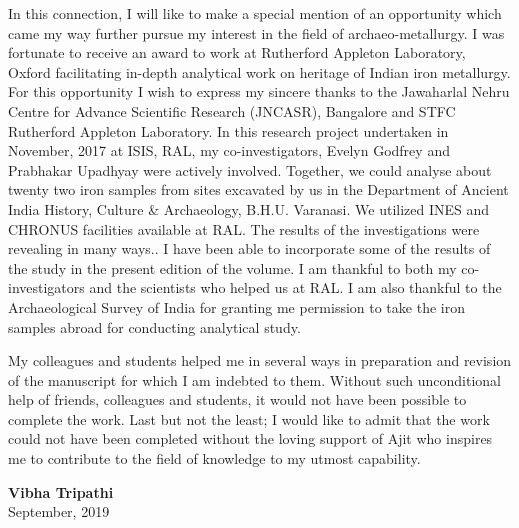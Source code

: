 In this connection, I will like to make a special mention of an opportunity which came my way further pursue my interest in the field of archaeo-metallurgy. I was fortunate to receive an award to work at Rutherford Appleton Laboratory, Oxford facilitating in-depth analytical work on heritage of Indian iron metallurgy. For this opportunity I wish to express my sincere thanks to the Jawaharlal Nehru Centre for Advance Scientific Research (JNCASR), Bangalore and STFC Rutherford Appleton Laboratory. In this research project undertaken in November, 2017 at ISIS, RAL, my co-investigators, Evelyn Godfrey and Prabhakar Upadhyay were actively involved. Together, we could analyse about twenty two iron samples from sites excavated by us in the Department of Ancient India History, Culture \& Archaeology, B.H.U. Varanasi. We utilized INES and CHRONUS facilities available at RAL. The results of the investigations were revealing in many ways.. I have been able to incorporate some of the results of the study in the present edition of the volume. I am thankful to both my co-investigators and the scientists who helped us at RAL. I am also thankful to the Archaeological Survey of India for granting me permission to take the iron samples abroad for conducting analytical study.

My colleagues and students helped me in several ways in preparation and revision of the manuscript for which I am indebted to them. Without such unconditional help of friends, colleagues and students, it would not have been possible to complete the work. Last but not the least; I would like to admit that the work could not have been completed without the loving support of Ajit who inspires me to contribute to the field of knowledge to my utmost capability.

\begin{flushright}
\textbf{Vibha Tripathi}\\ September, 2019
\end{flushright}

